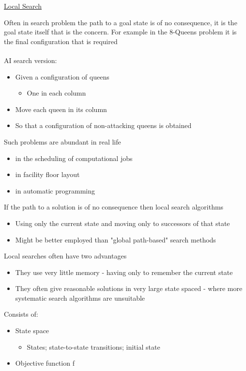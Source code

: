 \documentclass{article}[18pt]
\begin{document}
\begin{center}
\underline{\huge Local Search}
\end{center}
Often in search problem the path to a goal state is of no consequence, it is the goal state itself that is the concern. For example in the 8-Queens problem it is the final configuration that is required\\
\\
AI search version:
\begin{itemize}
	\item Given a configuration of queens
	\begin{itemize}
		\item One in each column
	\end{itemize}
	\item Move each queen in its column
	\item So that a configuration of non-attacking queens is obtained
\end{itemize}
Such problems are abundant in real life
\begin{itemize}
	\item in the scheduling of computational jobs
	\item in facility floor layout
	\item in automatic programming
\end{itemize}
If the path to a solution is of no consequence then local search algorithms
\begin{itemize}
	\item Using only the current state and moving only to successors of that state
	\item Might be better employed than "global path-based" search methods
\end{itemize}
Local searches often have two advantages
\begin{itemize}
	\item They use very little memory - having only to remember the current state
	\item They often give reasonable solutions in very large state spaced - where more systematic search algorithms are unsuitable
\end{itemize}
\begin{defin}
Consists of:
\begin{itemize}
	\item State space
	\begin{itemize}
		\item States; state-to-state transitions; initial state
	\end{itemize}
	\item Objective function f
\end{itemize}
\end{defin}
\end{document}
